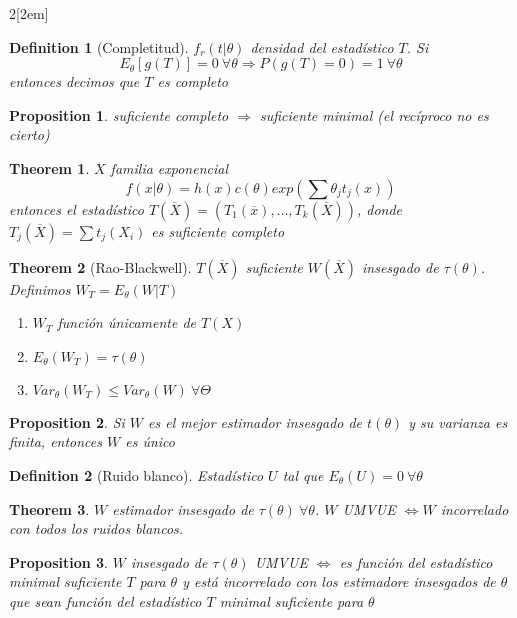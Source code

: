 \documentclass[leqno]{article}
\newtheorem*{theorem}{Theorem}
\newtheorem*{proposition}{Proposition}
\newtheorem*{definition}{Definition}
\begin{document}
\begin{multicols}{2}[\columnsep2em]
\begin{definition}[Completitud] $f_r(t|\theta)$ densidad del estadístico $T$. Si
   \[
	 E_\theta [g(T)] = 0 \ \forall \theta \Rightarrow P(g(T)=0)=1 \ \forall \theta 
  \] 
  entonces decimos que $T$ es completo
\end{definition}

\begin{proposition}
suficiente completo $\Rightarrow$ suficiente minimal (el recíproco no es cierto)
\end{proposition}

\begin{theorem}$X$ familia exponencial 
\[
f(x|\theta ) = h(x)c(\theta ) exp(\sum \theta _jt_j(x))
\] 
entonces el estadístico $T(\overline{X}) = (T_1(\overline{x}), \ldots, T_k(\overline{X}))$, donde $T_j(\overline{X}) = \sum t_j(X_i)$ es suficiente completo
\end{theorem}

\begin{theorem}[Rao-Blackwell] $T(\overline{X})$ suficiente $W(\overline{X})$ insesgado de $\tau (\theta )$. Definimos $W_T = E_\theta (W|T)$
  \begin{enumerate}[topsep=-6pt, itemsep=0pt]
    \item $W_T$ función únicamente de  $T(X)$
	\item  $E_\theta (W_T) = \tau (\theta )$
	\item $Var_\theta (W_T) \le Var_\theta (W) \ \forall \Theta$
  \end{enumerate}
\end{theorem}

\begin{proposition} Si $W$ es el mejor estimador insesgado de  $t(\theta)$ y su varianza es finita, entonces $W$ es único 
\end{proposition}

\begin{definition}[Ruido blanco] Estadístico $U$ tal que  $E_\theta (U)=0 \ \forall \theta $
\end{definition}

\begin{theorem} $W$ estimador insesgado de  $\tau (\theta )\ \forall \theta $. $W$ UMVUE  $\iff W$ incorrelado con todos los ruidos blancos. 
\end{theorem}

\begin{proposition}$W$ insesgado de  $\tau (\theta )$ UMVUE $\iff$ es función del estadístico minimal suficiente $T$ para $\theta$ y está incorrelado con los estimadore insesgados de $\theta $ que sean función del estadístico $T$ minimal suficiente para $\theta$
\end{proposition}


\end{multicols}
\end{document}
